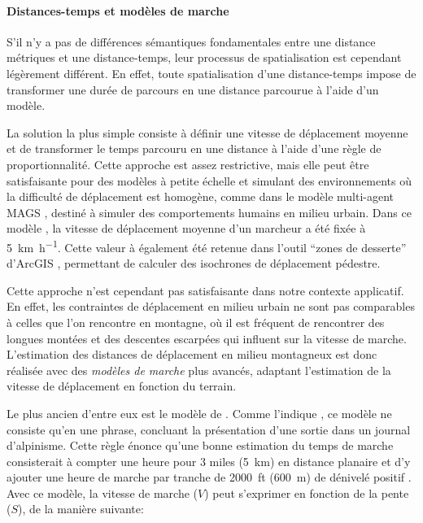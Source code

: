 
\paragraph{Distances-temps et modèles de marche}



S'il n'y a pas de différences sémantiques fondamentales entre une
distance métriques et une distance-temps, leur processus de
spatialisation est cependant légèrement différent. En effet, toute
spatialisation d'une distance-temps impose de transformer une durée de
parcours en une distance parcourue à l'aide d'un modèle.

La solution la plus simple consiste à définir une vitesse de
déplacement moyenne et de transformer le temps parcouru en une
distance à l'aide d'une règle de proportionnalité. Cette approche est
assez restrictive, mais elle peut être satisfaisante pour des modèles
à petite échelle et simulant des environnements où la difficulté de
déplacement est homogène, comme dans le modèle multi-agent MAGS
\autocite{Moulin2003}, destiné à simuler des comportements humains en
milieu urbain. Dans ce modèle \autocite{Moulin2003}, la vitesse de
déplacement moyenne d'un marcheur a été fixée à
\SI{5}{\kilo\meter\per\hour}. Cette valeur à également été retenue
dans l'outil \enquote{zones de desserte} d'ArcGIS \autocite{ESRI2020},
permettant de calculer des isochrones de déplacement pédestre.

Cette approche n'est cependant pas satisfaisante dans notre contexte
applicatif. En effet, les contraintes de déplacement en milieu urbain
ne sont pas comparables à celles que l'on rencontre en montagne, où il
est fréquent de rencontrer des longues montées et des descentes
escarpées qui influent sur la vitesse de marche. L'estimation des
distances de déplacement en milieu montagneux est donc réalisée avec
des \emph{modèles de marche} plus avancés, adaptant l'estimation de la
vitesse de déplacement en fonction du terrain.

Le plus ancien d'entre eux est le modèle de
\textcite{Naismith1892}. Comme l'indique \textcite{Duchene2019}, ce
modèle ne consiste qu'en une phrase, concluant la présentation d'une
sortie dans un journal d'alpinisme. Cette règle énonce qu'une bonne
estimation du temps de marche consisterait à compter une heure pour 3
miles (\SI{5}{\kilo\meter}) en distance planaire et d'y ajouter une
heure de marche par tranche de \SI{2000}{ft} (\SI{600}{\meter}) de
dénivelé positif \autocite{Naismith1892}. Avec ce modèle, la vitesse
de marche (\(V\)) peut s'exprimer en fonction de la pente (\(S\)), de
la manière suivante:

